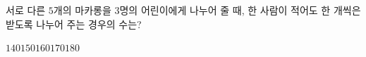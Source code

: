 \hspace*{2mm}\begin{minipage}[t]{\dimexpr\linewidth-2mm\relax}\vspace{0pt}
서로 다른 $5$개의 마카롱을 $3$명의 어린이에게 나누어 줄 때, 한 사람이 적어도 한 개씩은 받도록 나누어 주는 경우의 수는?
\begin{choices32}{$140$}{$150$}{$160$}{$170$}{$180$}\end{choices32}\end{minipage}
